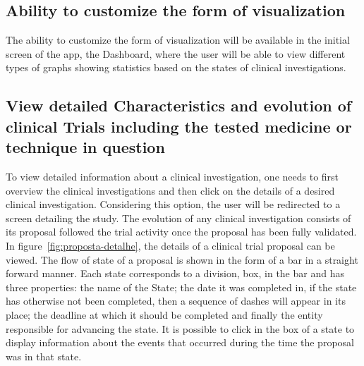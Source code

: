 \subsection{Ability to customize the form of visualization}
\label{subsec:ability-to-customize-visualization}
The ability to customize the form of visualization will be available in the initial screen of the app, the Dashboard, where the user will be able to view different types of graphs showing statistics based on the states of clinical investigations.

\subsection{View detailed Characteristics and evolution of clinical Trials including the tested medicine or technique in question}
\label{subsec:clinical-investigation-details}
To view detailed information about a clinical investigation, one needs to first overview the clinical investigations and then click on the details of a desired clinical investigation. Considering this option, the user will be redirected to a screen detailing the study.  
The evolution of any clinical investigation consists of its proposal followed the trial activity once the proposal has been fully validated.
In figure~\ref{fig:proposta-detalhe}, the details of a clinical trial proposal can be viewed. The flow of state of a proposal is shown in the form of a bar in a straight forward manner. Each state corresponds to a division, box, in the bar and has three properties: the name of the State; the date it was completed in, if the state has otherwise not been completed, then a sequence of dashes will appear in its place; the deadline at which it should be completed and finally the entity responsible for advancing the state.  
It is possible to click in the box of a state to display information about the events that occurred during the time the proposal was in that state. 

